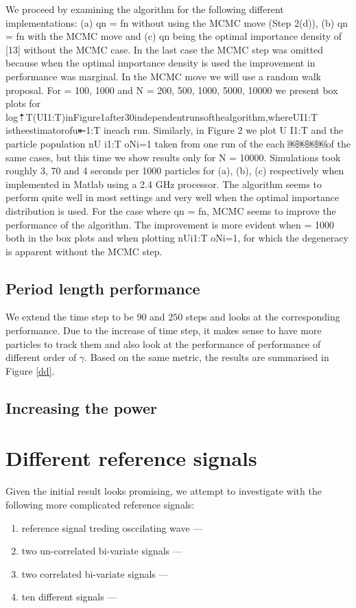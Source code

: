 We proceed by examining the algorithm for the following different implementations: (a) qn = fn without
using the MCMC move (Step 2(d)), (b) qn = fn with the MCMC move and (c) qn being the optimal importance density of [13] without the MCMC case. In the last case the MCMC step was omitted because when the optimal importance density is used the improvement in performance was marginal. In the MCMC move we will use a random walk proposal. For  = 100, 1000 and N = 200, 500, 1000, 5000, 10000 we present box plots for
log⇡T(UI1:T)inFigure1after30independentrunsofthealgorithm,whereUI1:T istheestimatorofu⇤1:T ineach run. Similarly, in Figure 2 we plot U I1:T and the particle population nU i1:T oNi=1 taken from one run of the each
￼￼￼￼of the same cases, but this time we show results only for N = 10000. Simulations took roughly 3, 70 and 4 seconds per 1000 particles for (a), (b), (c) respectively when implemented in Matlab using a 2.4 GHz processor. The algorithm seems to perform quite well in most settings and very well when the optimal importance distribution is used. For the case where qn = fn, MCMC seems to improve the performance of the algorithm.
The improvement is more evident when  = 1000 both in the box plots and when plotting nUi1:T oNi=1, for which the degeneracy is apparent without the MCMC step.

\subsection{Period length performance}
We extend the time step to be $90$ and $250$ steps and looks at the corresponding performance. Due to the increase of time step, it makes sense to have more particles to track them and also look at the performance of performance of different order of $\gamma$. Based on the same metric, the results are summarised in Figure \ref{dd}. 

\subsection{Increasing the power}

\section{Different reference signals}
Given the initial result looks promising, we attempt to investigate with the following more complicated reference signals:
\begin{enumerate}
\item reference signal treding osccilating wave ---
\item two un-correlated bi-variate signals ---
\item two correlated bi-variate signals ---
\item ten different signals ---
\end{enumerate}

